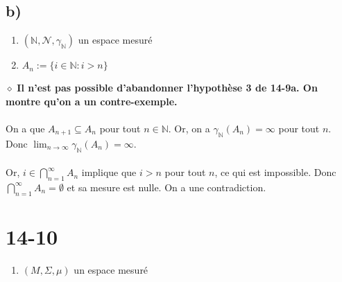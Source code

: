 \documentclass[a4paper,10pt]{article}
\begin{document}
\subsection*{b)}
\begin{enumerate}
	\item $(\mathbb{N}, \mathcal{N}, \gamma_\mathbb{N})$ un espace mesuré
	\item $A_n := \{ i \in \mathbb{N} : i > n \} $
\end{enumerate}
$\diamond$ \textbf{Il n'est pas possible d'abandonner l'hypothèse 3 de \textbf{14-9a}. On montre qu'on a un contre-exemple.}
\\
\\
On a que $A_{n+1} \subseteq A_n$ pour tout $n \in \mathbb{N}$. Or, on a $\gamma_\mathbb{N} (A_n) = \infty$ pour tout $n$. Donc $\lim_{n \to \infty} \gamma_\mathbb{N} (A_n) = \infty$.
\\
\\
Or, $i \in \bigcap_{n=1}^\infty A_n$ implique que $i > n$ pour tout $n$, ce qui est impossible. Donc $\bigcap_{n=1}^\infty A_n = \emptyset$ et sa mesure est nulle. On a une contradiction.

\section*{14-10}
\begin{enumerate}
	\item $(M, \Sigma, \mu)$ un espace mesuré
\end{enumerate} 
\end{document}

